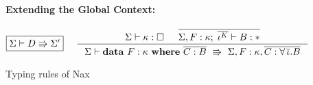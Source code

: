 \begin{figure}
\begin{framed}
\paragraph{Extending the Global Context:}
\[ \fbox{$\Sigma |- D \Rrightarrow \Sigma'$}
 ~~~~
   \inference[]{ \Sigma |- \kappa : \square
               & \overline{\Sigma,F:\kappa;\;\overline{\iota^K} |- B:*} }
               { \Sigma |- \mathbf{data}~ F : \kappa ~ \mathbf{where} ~
                                        \overline{C : B}
                        ~\Rrightarrow~
                           \Sigma,F:\kappa
                                 ,\overline{C:\forall\,\overline{\iota}.B} }
\]
\end{framed}

\caption{Typing rules of Nax}
\label{fig:NaxTyping}
\end{figure}



